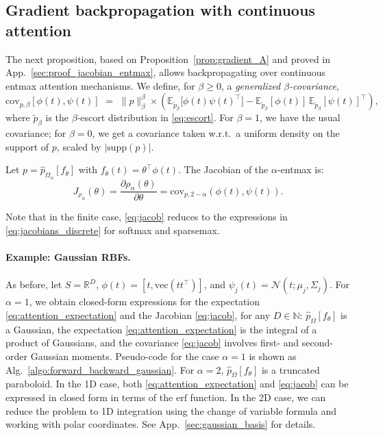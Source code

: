 \documentclass{article}
\begin{document}
\subsection{Gradient backpropagation with continuous attention}\label{sec:jacobian}


The next proposition, based on Proposition~\ref{prop:gradient_A} and proved in App.~\ref{sec:proof_jacobian_entmax}, allows backpropagating over continuous entmax attention mechanisms. We define, for $\beta \ge 0$, a {\it generalized $\beta$-covariance},
\begin{equation}\label{eq:beta_covariance}
\mathrm{cov}_{p, \beta}[\phi(t), \psi(t)] \,\,=\,\, \|p\|_\beta^\beta \times \left( \mathbb{E}_{\tilde{p}_\beta}\big[\phi(t) \psi(t)^\top\big] - \mathbb{E}_{\tilde{p}_\beta}[\phi(t)]\,  \mathbb{E}_{\tilde{p}_\beta}[\psi(t)]^\top
\right),
\end{equation}
where $\tilde{p}_\beta$ is the $\beta$-escort distribution in \eqref{eq:escort}.
For $\beta=1$, we have the usual covariance; for $\beta=0$, we get a covariance taken w.r.t.\ a uniform density on the support of $p$,  scaled by $|\mathrm{supp}(p)|$.


\vspace{0.1cm}
\begin{proposition}\label{prop:jacobian_entmax}
Let $p = \hat{p}_{\Omega_\alpha}[f_\theta]$ with $f_\theta(t) = \theta^\top \phi(t)$.
The Jacobian of the $\alpha$-entmax is:
    \begin{equation}\label{eq:jacob}
        J_{\rho_\alpha}(\theta) = \frac{\partial \rho_\alpha(\theta)}{\partial \theta} = \mathrm{cov}_{p, 2-\alpha}(\phi(t), \psi(t)).
    \end{equation}
\end{proposition}

Note that in the finite case, \eqref{eq:jacob} reduces to the expressions in \eqref{eq:jacobians_discrete} for softmax and sparsemax. 

\paragraph{Example: Gaussian RBFs.} 
As before, let $S = \mathbb{R}^D$, $\phi(t) = [t, \mathrm{vec}(tt^\top)]$, and $\psi_j(t) = \mathcal{N}(t; \mu_j, \Sigma_j)$. 
For $\alpha=1$, we obtain closed-form expressions for the expectation \eqref{eq:attention_expectation} and the Jacobian \eqref{eq:jacob}, for any $D \in \mathbb{N}$: 
$\hat{p}_\Omega[f_\theta]$ is a Gaussian, the expectation 
\eqref{eq:attention_expectation} is the integral of a product of Gaussians, and the covariance \eqref{eq:jacob} involves first- and second-order Gaussian moments. Pseudo-code for the case $\alpha=1$ is shown as Alg.~\ref{algo:forward_backward_gaussian}. 
For $\alpha=2$, $\hat{p}_\Omega[f_\theta]$ is a truncated paraboloid. 
In the 1D case, both \eqref{eq:attention_expectation} and \eqref{eq:jacob} can be expressed in closed form in terms of the $\mathrm{erf}$ function. 
In the 2D case, we can reduce the problem to 1D integration using the change of variable formula and working with polar coordinates. See App.~\ref{sec:gaussian_basis} for details. 
\end{document}
